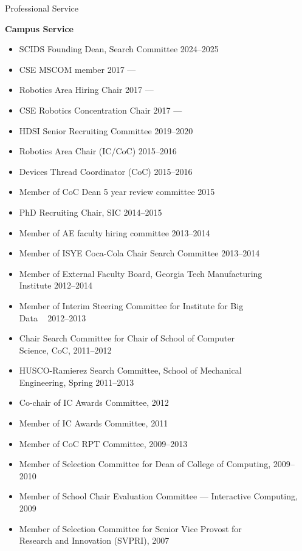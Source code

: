 \documentclass{article}
\begin{document}
\begin{cv}
\begin{cvlist}{Professional Service}
\item {\bf Campus Service}
  \begin{itemize}
  \item SCIDS Founding Dean, Search Committee \cftdotfill{\cftdotsep} 2024--2025
  \item CSE MSCOM member \cftdotfill{\cftdotsep} 2017 ---
  \item Robotics Area Hiring Chair \cftdotfill{\cftdotsep} 2017 ---
  \item CSE Robotics Concentration Chair \cftdotfill{\cftdotsep}
    2017 ---
  \item HDSI Senior Recruiting Committee  \cftdotfill{\cftdotsep} 2019--2020
  \item Robotics Area Chair (IC/CoC) \cftdotfill{\cftdotsep} 2015--2016
  \item Devices Thread Coordinator (CoC) \cftdotfill{\cftdotsep} 2015--2016
  \item Member of CoC Dean 5 year review committee
    \cftdotfill{\cftdotsep} 2015
  \item PhD Recruiting Chair, SIC \cftdotfill{\cftdotsep} 2014--2015
  \item Member of AE faculty hiring committee \cftdotfill{\cftdotsep}
    2013--2014
  \item Member of ISYE Coca-Cola Chair Search Committee
    \cftdotfill{\cftdotsep} 2013--2014
  \item Member of External Faculty Board, Georgia Tech Manufacturing\\
    Institute \cftdotfill{\cftdotsep} 2012--2014
  \item Member of Interim Steering Committee for Institute for Big
    \\Data \ \cftdotfill{\cftdotsep} 2012--2013
  \item Chair Search Committee for Chair of School of Computer\\
    Science, CoC, \cftdotfill{\cftdotsep} 2011--2012
  \item HUSCO-Ramierez Search Committee, School of Mechanical\\
    Engineering, Spring \cftdotfill{\cftdotsep} 2011--2013
  \item Co-chair of IC Awards Committee, \cftdotfill{\cftdotsep} 2012
  \item Member of IC Awards Committee, \cftdotfill{\cftdotsep} 2011
  \item Member of CoC RPT Committee, \cftdotfill{\cftdotsep} 2009--2013
  \item Member of Selection Committee for Dean of College of
    Computing, \cftdotfill{\cftdotsep} 2009--2010
  \item Member of School Chair Evaluation Committee --- Interactive
    Computing, \cftdotfill{\cftdotsep} 2009
  \item Member of Selection Committee for Senior Vice Provost for \\
    Research and Innovation (SVPRI), \cftdotfill{\cftdotsep} 2007
  \end{itemize}


\end{cvlist}
\end{cv}
\end{document}
